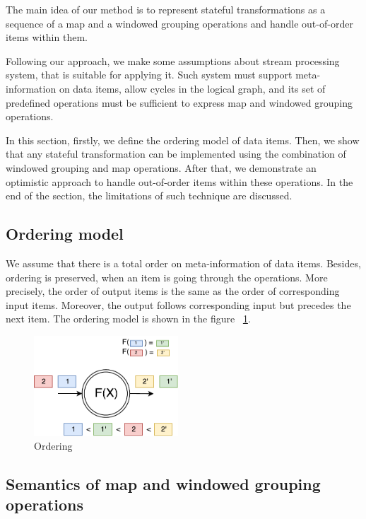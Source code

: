 
\label {fs-optimistic}

The main idea of our method is to represent stateful transformations as a sequence of a map and a windowed grouping operations and handle out-of-order items within them. 

Following our approach, we make some assumptions about stream processing system, that is suitable for applying it. Such system must support meta-information on data items, allow cycles in the logical graph, and its set of predefined operations must be sufficient to express map and windowed grouping operations.

In this section, firstly, we define the ordering model of data items. Then, we show that any stateful transformation can be implemented using the combination of windowed grouping and map operations. After that, we demonstrate an optimistic approach to handle out-of-order items within these operations. In the end of the section, the limitations of such technique are discussed.

\subsection{Ordering model}
We assume that there is a total order on meta-information of data items. Besides, ordering is preserved, when an item is going through the operations. More precisely, the order of output items is the same as the order of corresponding input items. Moreover, the output follows corresponding input but precedes the next item. The ordering model is shown in the figure ~\ref{ordering}.

\begin{figure}[htbp]
  \centering
  \includegraphics[width=0.48\textwidth]{pics/ordering}
  \caption{Ordering}
  \label {ordering}
\end{figure}

\subsection{Semantics of map and windowed grouping operations}

